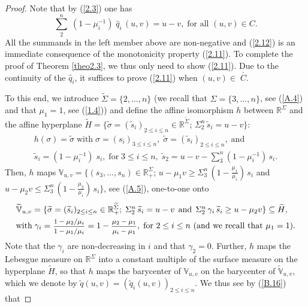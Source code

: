 \documentclass[12pt,leqno]{article}
\def\IR{{\mathbb R}}
\def\IV{{\mathbb V}}
\def\dis{\displaystyle}
\def\f{\footnotesize}
\def\wh{\widehat}
\def\wt{\widetilde}
\begin{document}
\begin{proof}
Note that by (\ref{2.3}) one has
\begin{equation}\label{2.13}
\dis\sum^n_2 \;(1 - \mu^{-1}_i) \; \wh{q}_i \,(u,v) = u-v, \; \mbox{for all $(u,v) \in C$}.
\end{equation}
All the summands in the left member above are non-negative and (\ref{2.12}) is an immediate consequence of the monotonicity property (\ref{2.11}). To complete the proof of Theorem \ref{theo2.3}, we thus only need to show (\ref{2.11}). Due to the continuity of the $\wh{q}_i$, it suffices to prove (\ref{2.11}) when $(u,v) \in \; \stackrel{_\circ}{C}$.

\medskip
To this end, we introduce $\wt{\Sigma} = \{2,\dots,n\}$ (we recall that $\Sigma = \{3,\dots, n\}$, see (\ref{A.4}) and that $\mu_1 = 1$, see (\ref{1.4})) and define the affine isomorphism $h$ between $\IR^\Sigma$ and the affine hyperplane $\wt{H} = \{\wt{\sigma} = (\wt{s}_i)_{2 \le i \le n} \in \IR^{\wt{\Sigma}}$; $\Sigma_2^n \, \wt{s}_i = u-v\}$:
\begin{equation}\label{2.14}
\begin{array}{l}
h(\sigma) = \wt{\sigma} \; \mbox{with} \; \sigma = (s_i)_{3 \le i \le n}, \; \wt{\sigma} = (\wt{s}_i)_{2 \le  i \le n}, \; \mbox{and}
\\[1ex]
\wt{s}_i = (1 - \mu^{-1}_i) \; s_i, \; \mbox{for} \; 3 \le i \le n, \; \wt{s}_2 = u-v - \sum^n_3 (1- \mu_i^{-1}) \, s_i .
\end{array}
\end{equation}
Then, $h$ maps $\IV_{u,v} = \{(s_3,\dots, s_n) \in \IR^\Sigma_+$; $u - \mu_1 v \ge \Sigma^n_3 \,(1 - \frac{\mu_1}{\mu_i})\, s_i$ and $u - \mu_2 v \le \Sigma^n_3 \,(1 - \frac{\mu_2}{\mu_i}) \,s_i\}$, see (\ref{A.5}), one-to-one onto
\begin{equation}\label{2.15}
\begin{array}{l}
\wt{\IV}_{u,v} = \{ \wt{\sigma} = (\wt{s}_i)_{2 \le i \le n} \in \IR^{\wt{\Sigma}}_+; \; \Sigma_2^n \, \wt{s}_i = u-v \;\,\mbox{and} \; \,\Sigma_2^n \, \gamma_i \,\wt{s}_i \ge u - \mu_2 v\} \subseteq \wt{H},
\\[1ex]
\mbox{with} \; \gamma_i = \mbox{\f $\dis\frac{1 - \mu_2/\mu_i}{1 - \mu_1/\mu_i}$} = 1 -  \mbox{\f $\dis\frac{\mu_2-\mu_1}{ \mu_i - \mu_1}$} , \; \mbox{for $2 \le i \le n$ (and we recall that $\mu_1 = 1)$}.
\end{array}
\end{equation}
Note that the $\gamma_i$ are non-decreasing in $i$ and that $\gamma_2 = 0$. Further, $h$ maps the Lebesgue measure on $\IR^\Sigma$ into a constant multiple of the surface measure on the hyperplane $\wt{H}$, so that $h$ maps the barycenter of $\IV_{u,v}$ on the barycenter of $\wt{\IV}_{u,v}$, which we denote by $\wt{q}(u,v) = (\wt{q}_i (u,v))_{2 \le i \le n}$. We thus see by (\ref{B.16}) that

\end{proof}
\end{document}
